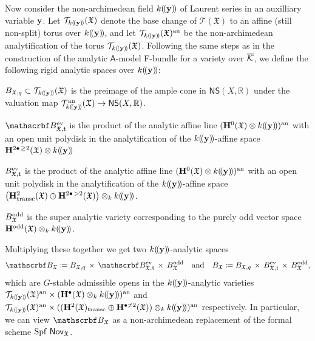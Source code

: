 \documentclass[twoside,leqno]{article}
\numberwithin{equation}{section}
\theoremstyle{plain}
\theoremstyle{definition}
\begin{document}
Now consider the non-archimedean field $k(\!(\mathbf{y})\!)$ of
Laurent series in an auxilliary variable $\mathbf{y}$. Let
$\mathcal{T}_{k(\!(\mathbf{y})\!)}(\mathfrak{X})$ denote the base change of
$\mathcal{T}(\mathfrak{X})$ to an affine (still non-split) torus over
$k(\!(\mathbf{y})\!)$, and let
$\mathcal{T}_{k(\!(\mathbf{y})\!)}(\mathfrak{X})^{\operatorname{an}}$ be the non-archimedean
analytification of the torus
$\mathcal{T}_{k(\!(\mathbf{y})\!)}(\mathfrak{X})$. Following the same steps as in the
construction of the analytic $\mathsf{A}$-model F-bundle for a variety
over $\overline{\mathcal K}$, we define the following rigid analytic spaces over
$k(\!(\mathbf{y})\!)$:
\begin{description}
\item $B_{\mathfrak{X},q} \subset
  \mathcal{T}_{k(\!(\mathbf{y})\!)}(\mathfrak{X})$ is the preimage of the ample cone
  in $\mathsf{NS}(X,\mathbb{R})$ under the valuation map
  $\mathcal{T}_{k(\!(\mathbf{y})\!)}^{\operatorname{an}}(\mathfrak{X}) \to
  \mathsf{NS}(X,\mathbb{R})$.
\item $\omB_{\mathfrak{X,t}}^{\even}$ is the product of the
  analytic affine line $(\mathbf{H}^{0}(\mathfrak{X})\otimes
  k(\!(\mathbf{y})\!))^{\operatorname{an}}$
  with an open unit polydisk in the
  analytification of the $k(\!(\mathbf{y})\!)$-affine space
$\mathbf{H}^{2\bullet \, \geq 2}(\mathfrak{X})
  \otimes k(\!(\mathbf{y})\!)$
\item $B_{\mathfrak{X,t}}^{\mathrm{ev}}$ is the product of the analytic
  affine line $(\mathbf{H}^{0}(\mathfrak{X})\otimes
  k(\!(\mathbf{y})\!))^{\operatorname{an}}$ with an open unit polydisk in the
  analytification of the $k(\!(\mathbf{y})\!)$-affine space
  $\left(\mathbf{H}^{2}_{\operatorname{transc}}(\mathfrak{X})\oplus
  \mathbf{H}^{2\bullet\, >2}(\mathfrak{X})\right) \otimes_{k} k(\!(\mathbf{y})\!)$.
\item $B_{\mathfrak{X}}^{\mathrm{odd}}$ is the super analytic variety
  corresponding to the purely odd vector space \linebreak
  $\mathbf{H}^{\mathrm{odd}}(\mathfrak{X})\otimes_{k} k(\!(\mathbf{y})\!)$.
\end{description}
Multiplying these together we get two $k(\!(\mathbf{y})\!)$-analytic spaces 
\[
\omB_{\mathfrak{X}} \coloneqq B_{\mathfrak{X},q} \, \times \,
\omB_{\mathfrak{X,t}}^{\even} \, \times \, B_{\mathfrak{X}}^{\odd}
\quad \text{and} \quad B_{\mathfrak{X}} \coloneqq B_{\mathfrak{X},q} \,
\times \, B_{\mathfrak{X,t}}^{\even} \, \times \,
B_{\mathfrak{X}}^{\odd},
\]
which are $G$-stable admissible opens in the $k(\!(\mathbf{y})\!)$-analytic varieties
$\mathcal{T}_{k(\!(\mathbf{y})\!)}(\mathfrak{X})^{\operatorname{an}}\times
(\mathbf{H}^{\bullet}(\mathfrak{X})\otimes_{k} k(\!(\mathbf{y})\!))^{\operatorname{an}}$ and
$\mathcal{T}_{k(\!(\mathbf{y})\!)}(\mathfrak{X})^{\operatorname{an}}\times ((\mathbf{H}^{2}(\mathfrak{X})_{\operatorname{transc}}\oplus \mathbf{H}^{\bullet\neq 2}(\mathfrak{X}))\otimes_{k} k(\!(\mathbf{y})\!))^{\operatorname{an}}$
respectively.  In particular, we can view $\omB_{\mathfrak{X}}$ as a
non-archimedean replacement of the formal scheme $\operatorname{Spf}\,
\mathsf{Nov}_{\mathfrak{X}}$.
\end{document}
